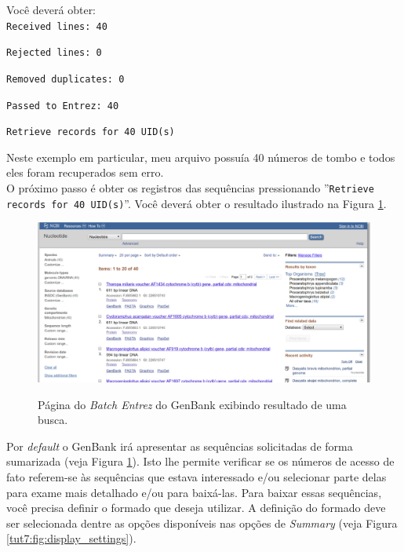 \begin{refsection}
Você deverá obter:\\

\scriptsize
\noindent\texttt{Received lines: 40}

\noindent\texttt{Rejected lines: 0}

\noindent\texttt{Removed duplicates: 0}

\noindent\texttt{Passed to Entrez: 40}

\noindent\texttt{Retrieve records for 40 UID(s)}

\normalsize

Neste exemplo em particular, meu arquivo possuía 40 números de tombo e todos eles foram recuperados sem erro.\\
O próximo passo é obter os registros das sequências pressionando ''\texttt{Retrieve records for 40 UID(s)}''. Você deverá obter o resultado ilustrado na Figura \ref{tut7:fig:bacth_entrez_2}.\\

  \begin{figure}[H]
      {\includegraphics[scale=0.3]{figures/tut7/entrez_2.eps}}
	{\caption[GenBnank \textit{Batch Entrez}: resultado de busca]{Página do \textit{Batch Entrez} do GenBank exibindo resultado de uma busca.}\label{tut7:fig:bacth_entrez_2}}
  \end{figure}


Por \textit{default} o GenBank irá apresentar as sequências solicitadas de forma sumarizada (veja Figura \ref{tut7:fig:bacth_entrez_2}). Isto lhe permite verificar se os números de acesso de fato referem-se às sequências que estava interessado e/ou selecionar parte delas para exame mais detalhado e/ou para baixá-las. Para baixar essas sequências, você precisa definir o formado que deseja utilizar. A definição do formado deve ser selecionada dentre as opções disponíveis nas opções de \textit{Summary} (veja Figura \ref{tut7:fig:display_settings}).


\end{refsection}

